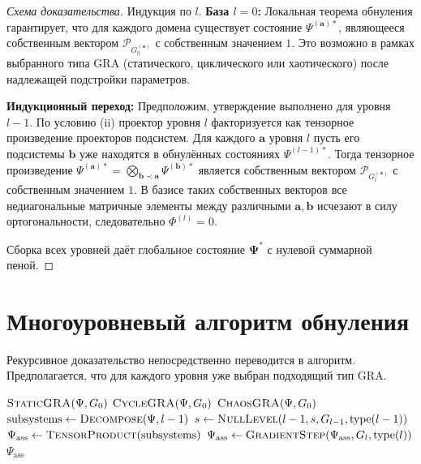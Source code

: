 \documentclass[12pt,a4paper]{article}
\newcommand{\pG}{\mathcal{P}_{G}}
\begin{document}
\begin{proof}[Схема доказательства]
Индукция по $l$.
\textbf{База $l=0$:} Локальная теорема обнуления гарантирует, что для каждого домена существует состояние $\Psi^{(\mathbf{a})*}$, являющееся собственным вектором $\pG_0^{(\mathbf{a})}$ с собственным значением $1$. Это возможно в рамках выбранного типа GRA (статического, циклического или хаотического) после надлежащей подстройки параметров.

\textbf{Индукционный переход:} Предположим, утверждение выполнено для уровня $l-1$. По условию (ii) проектор уровня $l$ факторизуется как тензорное произведение проекторов подсистем. Для каждого $\mathbf{a}$ уровня $l$ пусть его подсистемы $\mathbf{b}$ уже находятся в обнулённых состояниях $\Psi^{(l-1)*}$. Тогда тензорное произведение $\Psi^{(\mathbf{a})*} = \bigotimes_{\mathbf{b}\prec\mathbf{a}} \Psi^{(\mathbf{b})*}$ является собственным вектором $\pG_l^{(\mathbf{a})}$ с собственным значением $1$. В базисе таких собственных векторов все недиагональные матричные элементы между различными $\mathbf{a},\mathbf{b}$ исчезают в силу ортогональности, следовательно $\Phi^{(l)}=0$.

Сборка всех уровней даёт глобальное состояние $\mathbf{\Psi}^*$ с нулевой суммарной пеной.
\end{proof}

\section{Многоуровневый алгоритм обнуления}
Рекурсивное доказательство непосредственно переводится в алгоритм. Предполагается, что для каждого уровня уже выбран подходящий тип GRA.

\begin{algorithm}
\caption{Мультиверсная GRA-обнулёнка}
\begin{algorithmic}[1]
     \Return $\textsc{StaticGRA}(\Psi, G_0)$
     \Return $\textsc{CycleGRA}(\Psi, G_0)$
     \Return $\textsc{ChaosGRA}(\Psi, G_0)$
    \EndIf
\Else
    \State $\text{subsystems} \gets \textsc{Decompose}(\Psi, l-1)$
        \State $s \gets \textsc{NullLevel}(l-1, s, G_{l-1}, \text{type}(l-1))$
    \EndFor
    \State $\Psi_{\text{ass}} \gets \textsc{TensorProduct}(\text{subsystems})$
        \State $\Psi_{\text{ass}} \gets \textsc{GradientStep}(\Psi_{\text{ass}}, G_l, \text{type}(l))$
    \EndWhile
    \State \Return $\Psi_{\text{ass}}$
\EndIf
\EndFunction
\end{algorithmic}
\end{algorithm}
\end{document}
